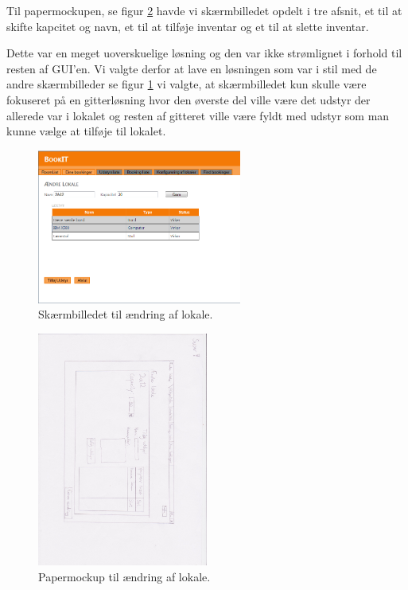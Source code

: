 Til papermockupen, se figur \ref{Design_G_Development_AendreLokale} havde vi skærmbilledet opdelt i tre afsnit, et til at skifte kapcitet og navn, et til at tilføje inventar og et til at slette inventar.

Dette var en meget uoverskuelige løsning og den var ikke strømlignet i forhold til resten af GUI'en. Vi valgte derfor at lave en løsningen som var i stil med de andre skærmbilleder se figur \ref{Design_G_Development_AendreLokale_Final} vi valgte, at skærmbilledet kun skulle være fokuseret på en gitterløsning hvor den øverste del ville være det udstyr der allerede var i lokalet og resten af gitteret ville være fyldt med udstyr som man kunne vælge at tilføje til lokalet.

\begin{figure}[h!]
  \centering
    \includegraphics[width=0.6\textwidth]{Appendix/GUI-Prototype/DigitalMockup/AendreLokale}
  \caption{Skærmbilledet til ændring af lokale.}
\label{Design_G_Development_AendreLokale_Final}
\end{figure} 

\begin{figure}[h!]
  \centering
    \includegraphics[angle=90, width=0.5\textwidth]{Appendix/GUI-Prototype/PaperMockup/AendreLokale_001}
  \caption{Papermockup til ændring af lokale.}
\label{Design_G_Development_AendreLokale}
\end{figure} 